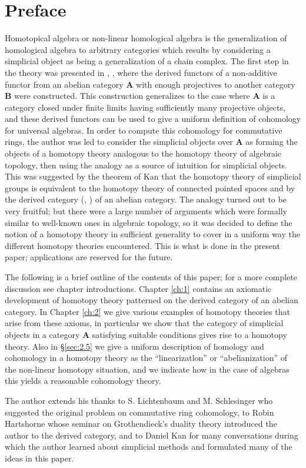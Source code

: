 \documentclass[../main]{subfiles}
\begin{document}
\chapter*{Preface}

Homotopical algebra or non-linear homological algebra is the
generalization of homological algebra to arbitrary categories
which results by considering a simplicial object as being a generalization of a chain complex. The first step in the theory was presented in \cite{dold_homology_1958}, \cite{dold_homologie_1961}, where the derived functors of a non-additive functor from an abelian category $\mathbf{A}$ with enough projectives to another category $\mathbf{B}$ were constructed. This construction generalizes to the case where $\mathbf{A}$ is a category closed under finite limits having sufficiently many projective objects, and these derived functors can be used to give a uniform definition of cohomology for universal algebras. In order to compute this cohomology for commutative rings, the author was led to consider the
simplicial objects over $\mathbf{A}$ as forming the objects of a homotopy
theory analogous to the homotopy theory of algebraic topology,
then using the analogy as a source of intuition for simplicial
objects. This was suggested by the theorem of Kan \cite{kan_homotopy_1958} that the
homotopy theory of simplicial groups is equivalent to the homotopy theory of connected pointed spaces and by the derived category (\cite{hartshorne_residues_1966}, \cite{verdier_categories_nodate}) of an abelian category. The analogy turned out
to be very fruitful; but there were a large number of arguments which were formally similar to well-known ones in algebraic topology, so it was decided to define the notion of a homotopy theory
in sufficient generality to cover in a uniform way the different
homotopy theories encountered. This is what is done in the present paper; applications are reserved for the future. 

The following is a brief outline of the contents of this paper; for a more complete discussion see chapter introductions. Chapter \ref{ch:1} contains an axiomatic development of homotopy theory patterned on the derived category of an abelian category. In Chapter \ref{ch:2} we
give various examples of homotopy theories that arise from these
axioms, in particular we show that the category of simplicial objects in a category $\mathbf{A}$ satisfying suitable conditions gives rise
to a homotopy theory. Also in \S\ref{sec:2.5} we give a uniform description
of homology and cohomology in a homotopy theory as the ``linearizatlon'' or ``abelianization'' of the non-linear homotopy situation,
and we indicate how in the case of algebras this yields a reasonable cohomology theory.

The author extends his thanks to S. Lichtenbaum and
M. Schlesinger who suggested the original problem on commutative
ring cohomology, to Robin Hartshorne whose seminar \cite{hartshorne_residues_1966} on
Grothendieck's duality theory introduced the author to the derived
category, and to Daniel Kan for many conversations during which
the author learned about simplicial methods and formulated many
of the ideas in this paper.
\end{document}
